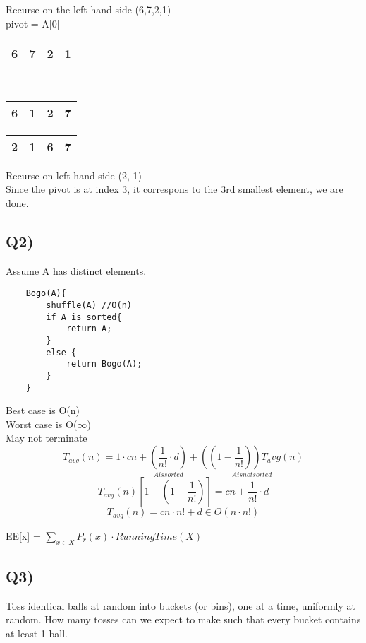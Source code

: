 \documentclass[12pt]{article}
\begin{document}
	Recurse on the left hand side (6,7,2,1)\\
	pivot = A[0]\\
	\begin{tabular}{|c | c | c | c|}
		\hline
		6 & \underline{7} & 2 & \underline{1} \\ \hline
	\end{tabular}\\
	\begin{tabular}{|c | c | c | c|}
		\hline
		6 & 1 & 2 & 7 \\ \hline
	\end{tabular}
	\begin{tabular}{|c | c | c | c|}
		\hline
		2 & 1 & 6 & 7 \\ \hline
	\end{tabular}
	
	Recurse on left hand side (2, 1)\\
	
	Since the pivot is at index 3, it correspons to the 3rd smallest element, we are done.\\
	
	\subsection*{Q2)}
	Assume A has distinct elements.\\
	\begin{verbatim}
	Bogo(A){
		shuffle(A) //O(n)
		if A is sorted{
			return A;
		}
		else {
			return Bogo(A);
		}
	}
	\end{verbatim}
	
	Best case is O(n)\\
	Worst case is O($\infty$)\\
	May not terminate\\
	
	$$T_{avg}(n) = 1 \cdot cn + \underset{A is sorted}{(\frac{1}{n!} \cdot d)} + \underset{A is not sorted}{((1-\frac{1}{n!}))T_avg(n)}$$
	$$T_{avg}(n)[1-(1-\frac{1}{n!})] = cn + \frac{1}{n!} \cdot d$$
	$$T_{avg}(n) = cn \cdot n! + d \in O(n \cdot n!)$$
	
	EE[x] = $\sum_{x \in X}P_r(x) \cdot RunningTime(X)$\\
	 
	\subsection*{Q3)}
	
	Toss identical balls at random into buckets (or bins), one at a time, uniformly at random. How many tosses can we expect to make such that every bucket contains at least 1 ball.\\
	
\end{document}
